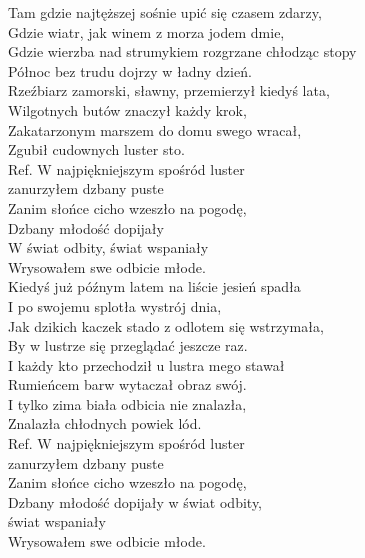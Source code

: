 
\begin{flushleft}
Tam gdzie najtęższej sośnie upić się czasem zdarzy, \\
Gdzie wiatr, jak winem z morza jodem dmie,\tab{} \\
Gdzie wierzba nad strumykiem rozgrzane chłodząc stopy \\
Północ bez trudu dojrzy w ładny dzień. \tab{}\\
Rzeźbiarz zamorski, sławny, przemierzył kiedyś lata, \\
Wilgotnych butów znaczył każdy krok, \tab{}\\
Zakatarzonym marszem do domu swego wracał, \\
Zgubił cudownych luster sto. \tab{}\tab{}\\
\vskip 3mm
Ref. W najpiękniejszym spośród luster \tab{} \\
\hspace{0.9cm}zanurzyłem dzbany puste \tab{}\tab{}\\
\hspace{0.9cm}Zanim słońce cicho wzeszło na pogodę, \tab{}\\
\hspace{0.9cm}Dzbany młodość dopijały \tab{}\tab{}\\
\hspace{0.9cm}W świat odbity, świat wspaniały \tab{}\\
\hspace{0.9cm}Wrysowałem swe odbicie młode. \tab{}\\
\vskip 3mm
Kiedyś już późnym latem na liście jesień spadła \\
I po swojemu splotła wystrój dnia, \\
Jak dzikich kaczek stado z odlotem się wstrzymała, \\
By w lustrze się przeglądać jeszcze raz. \\
I każdy kto przechodził u lustra mego stawał \\
Rumieńcem barw wytaczał obraz swój. \\
I tylko zima biała odbicia nie znalazła, \\
Znalazła chłodnych powiek lód. \\
\vskip 3mm
Ref. W najpiękniejszym spośród luster \\
\hspace{0.9cm}zanurzyłem dzbany puste \\
\hspace{0.9cm}Zanim słońce cicho wzeszło na pogodę, \\
\hspace{0.9cm}Dzbany młodość dopijały w świat odbity, \\
\hspace{0.9cm}świat wspaniały \\
\hspace{0.9cm}Wrysowałem swe odbicie młode. \\
\end{flushleft}
\clearpage
